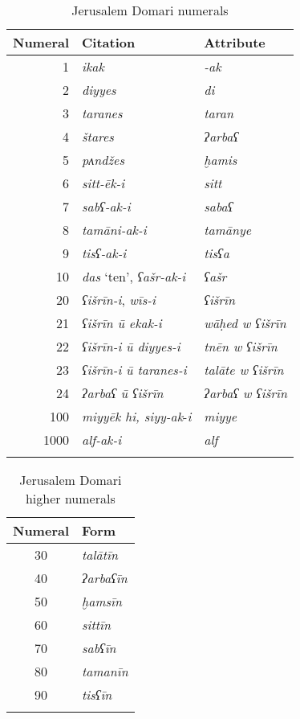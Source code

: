 \documentclass[output=paper]{langsci/langscibook}
\begin{document}
\begin{table}[]
\begin{tabular}{rll}
\lsptoprule Numeral & Citation & Attribute\\
\midrule
1 & \textit{ikak} & \textit{-ak}\\
2 & \textit{diyyes} & \textit{di}\\
3 & \textit{taranes}  & \textit{taran}\\
4 & \textit{štares}  & \textit{ʔarbaʕ}\\
5 & \textit{pʌndžes}  & \textit{ḫamis}\\
6 & \textit{sitt-ēk-i} & \textit{sitt}\\
7 & \textit{sabʕ-ak-i} & \textit{sabaʕ}\\
8 & \textit{tamāni-ak-i} & \textit{tamānye}\\
9 & \textit{tisʕ-ak-i} & \textit{tisʕa}\\
10 & \textit{das} ‘ten’, \textit{ʕašr-ak-i} & \textit{ʕašr}\\
20 & \textit{ʕišrīn-i}, \textit{wīs-i} & \textit{ʕišrīn}\\
21 & \textit{ʕišrīn ū ekak-i} & \textit{wāḥed w ʕišrīn}\\
22 & \textit{ʕišrīn-i ū diyyes-i} & \textit{tnēn w ʕišrīn}\\
23 & \textit{ʕišrīn-i ū taranes-i} & \textit{talāte w ʕišrīn}\\
24 & \textit{ʔarbaʕ ū ʕišrīn} & \textit{ʔarbaʕ w ʕišrīn}\\
100 & \textit{miyyēk hi, siyy-ak}-\textit{i} & \textit{miyye}\\
1000 & \textit{alf-ak-i} & \textit{alf}\\
\lspbottomrule
\end{tabular}
\caption{Jerusalem Domari numerals}
\label{numerals1}
\end{table}

\begin{table}[]
\begin{tabular}{cl}
\lsptoprule Numeral & Form\\
\midrule
30 & \textit{talātīn}\\
40 & \textit{ʔarbaʕīn}\\
50 & \textit{ḫamsīn}\\
60 & \textit{sittīn}\\
70 & \textit{sabʕīn}\\
80 & \textit{tamanīn}\\
90 & \textit{tisʕīn}\\
\lspbottomrule
\end{tabular}
\caption{Jerusalem Domari higher numerals}
\label{numerals2}
\end{table}
\end{document}
